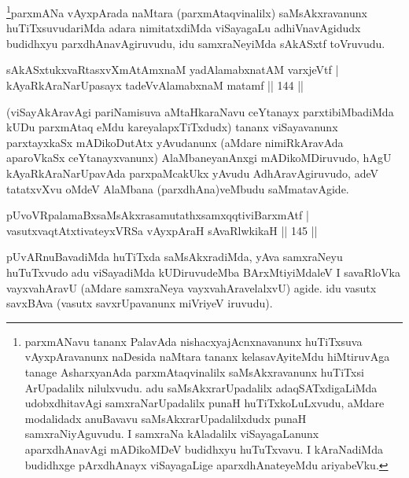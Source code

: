 \begin{artha}
\footnote{parxmANavu tananx PalavAda nishacxyajAcnxnavanunx huTiTxsuva vAyxpAravanunx naDesida naMtara tananx kelasavAyiteMdu hiMtiruvAga tanage AsharxyanAda parxmAtaqvinalilx saMsAkxravanunx huTiTxsi ArUpadalilx nilulxvudu. adu saMsAkxrarUpadalilx adaqSATxdigaLiMda udobxdhitavAgi samxraNarUpadalilx punaH huTiTxkoLuLxvudu, aMdare modalidadx anuBavavu saMsAkxrarUpadalilxdudx punaH samxraNiyAguvudu. I samxraNa kAladalilx viSayagaLanunx aparxdhAnavAgi mADikoMDeV budidhxyu huTuTxvavu. I kAraNadiMda budidhxge pArxdhAnayx viSayagaLige aparxdhAnateyeMdu ariyabeVku.}parxmANa vAyxpArada naMtara (parxmAtaqvinalilx) saMsAkxravanunx huTiTxsuvudariMda adara nimitatxdiMda viSayagaLu adhiVnavAgidudx budidhxyu parxdhAnavAgiruvudu, idu samxraNeyiMda sAkASxtf toVruvudu.
\end{artha}


\begin{shl}
sAkASxtukxvaRtasxvXmAtAmxnaM yadAlamabxnatAM varxjeVtf |\\
kAyaRkAraNarUpasayx tadeVvA\s \s lamabxnaM matamf \hfill || 144 ||
\end{shl}

\begin{artha}
(viSayAkAravAgi pariNamisuva aMtaHkaraNavu ceYtanayx parxtibiMbadiMda kUDu parxmAtaq eMdu kareyalapxTiTxdudx) tananx viSayavanunx parxtayxkaSx mADikoDutAtx yAvudanunx (aMdare nimiRkAravAda aparoVkaSx ceYtanayxvanunx) AlaMbaneyanAnxgi mADikoMDiruvudo, hAgU kAyaRkAraNarUpavAda parxpaMcakUkx yAvudu AdhAravAgiruvudo, adeV tatatxvXvu oMdeV AlaMbana (parxdhAna)veMbudu saMmatavAgide.
\end{artha}


\begin{shl}
pUvoVRpalamaBxsaMsAkxrasamutathxsamxqqtiviBarxmAtf |\\
vasutxvaqtAtxtivateyxVRSa vAyxpAraH sAvaRlwkikaH \hfill || 145 ||
\end{shl}

\begin{artha}
pUvARnuBavadiMda huTiTxda saMsAkxradiMda, yAva samxraNeyu huTuTxvudo adu viSayadiMda kUDiruvudeMba BArxMtiyiMdaleV I savaRloVka vayxvahAravU (aMdare samxraNeya vayxvahAravelalxvU) agide. idu vasutx savxBAva (vasutx savxrUpavanunx miVriyeV iruvudu).
\end{artha}

